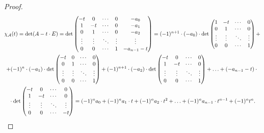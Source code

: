\begin{proof}
    \begin{multline*}
        \chi_{\mathcal{A}}(t) = \det(A - t \cdot E) = \det
        \begin{pmatrix}
            -t & 0 & \cdots & 0 & -a_0\\
            1 & -t & \cdots & 0 & -a_1\\
            0 & 1 & \cdots & 0 & -a_2\\
            \vdots & \vdots & \ddots & \vdots & \vdots\\
            0 & 0 & \cdots & 1 & -a_{n - 1} - t
        \end{pmatrix} = (-1)^{n + 1} \cdot (-a_0) \cdot \det
        \begin{pmatrix}
            1 & -t & \cdots & 0\\
            0 & 1 & \cdots & 0\\
            \vdots & \vdots & \ddots & \vdots\\
            0 & 0 & \cdots & 1
        \end{pmatrix} + \\
        + (-1)^n \cdot (-a_1) \cdot \det
        \begin{pmatrix}
            -t & 0 & \cdots & 0\\
            0 & 1 & \cdots & 0\\
            \vdots & \vdots & \ddots & \vdots\\
            0 & 0 & \cdots & 1
        \end{pmatrix} + (-1)^{n + 1} \cdot (-a_2) \cdot \det
        \begin{pmatrix}
            -t & 0 & \cdots & 0\\
            1 & -t & \cdots & 0\\
            \vdots & \vdots & \ddots & \vdots\\
            0 & 0 & \cdots & 1
        \end{pmatrix} + \ldots + (-a_{n - 1} - t) \cdot {}\\{} \cdot \det
        \begin{pmatrix}
            -t & 0 & \cdots & 0\\
            1 & -t & \cdots & 0\\
            \vdots & \vdots & \ddots & \vdots\\
            0 & 0 & \cdots & -t
        \end{pmatrix} = (-1)^na_0 + (-1)^na_1 \cdot t + (-1)^na_2 \cdot t^2 + \ldots + (-1)^na_{n - 1} \cdot t^{n - 1} + (-1)^nt^n.
    \end{multline*}
\end{proof}

